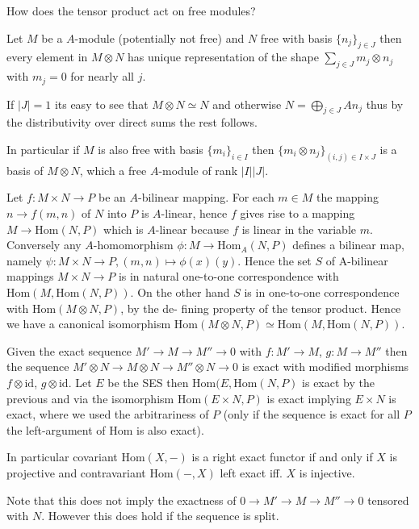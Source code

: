 How does the tensor product act on free modules?

Let \(M\) be a \(A\)-module (potentially not free) and \(N\) free with basis \(\{n_j\}_{j \in J}\)
then every element in \(M \otimes N\) has unique representation of the shape
\(\sum_{j \in J} m_j \otimes n_j\) with \(m_j = 0\) for nearly all \(j\).

If \(|J| = 1\) its easy to see that \(M \otimes N \simeq N\) and otherwise \(N = \bigoplus_{j \in J} A n_j\)
thus by the distributivity over direct sums the rest follows.

In particular if \(M\) is also free with basis \(\{m_i\}_{i \in I}\) then \(\{m_i \otimes n_j\}_{(i, j) \in I \times J}\) is a
basis of \(M \otimes N\), which a free \(A\)-module of rank \(|I||J|\).

Let \(f: M \times N \to P\) be an \(A\)-bilinear mapping. For each \(m \in M\) the mapping
\(n \to f(m, n)\) of \(N\) into \(P\) is \(A\)-linear, hence \(f\) gives rise to a mapping 
\(M \to \text{Hom}(N, P)\) which is \(A\)-linear because \(f\) is linear in the variable \(m\). Conversely
any \(A\)-homomorphism \(\phi: M \to \text{Hom}_A(N, P)\) defines a bilinear map, namely
\(\psi: M \times N \to P, (m, n) \mapsto \phi(x)(y)\). Hence the set \(S\) of A-bilinear mappings \(M \times N \to P\) is in
natural one-to-one correspondence with \(\text{Hom}(M, \text{Hom}(N, P))\). On the other
hand \(S\) is in one-to-one correspondence with \(\text{Hom}(M \otimes N, P)\), by the de-
fining property of the tensor product. Hence we have a canonical isomorphism
\(\text{Hom}(M \otimes N, P) \simeq \text{Hom}(M, \text{Hom}(N, P))\).

Given the exact sequence
\(M' \to M \to M'' \to 0\) with \(f : M' \to M\), \(g : M \to M''\) then the sequence \(M' \otimes N \to M \otimes N \to M'' \otimes N \to 0\) is exact
with modified morphisms \(f \otimes \text{id}\), \(g \otimes \text{id}\). 
Let \(E\) be the SES then \(\text{Hom}(E, \text{Hom}(N, P)\) is exact by the previous and via the isomorphism \(\text{Hom}(E \times N, P)\) is exact implying
\(E \times N\) is exact, where we used the arbitrariness of \(P\) (only if the sequence is exact for all \(P\) the left-argument of Hom is also exact).

In particular covariant \(\text{Hom}(X, -)\) is a right exact functor if and only if \(X\) is projective and contravariant \(\text{Hom}(-, X)\) left exact iff. \(X\) 
is injective.

Note that this does not imply the exactness of \(0 \to M' \to M \to M'' \to 0\) tensored with \(N\). However this does hold if the sequence is split.

